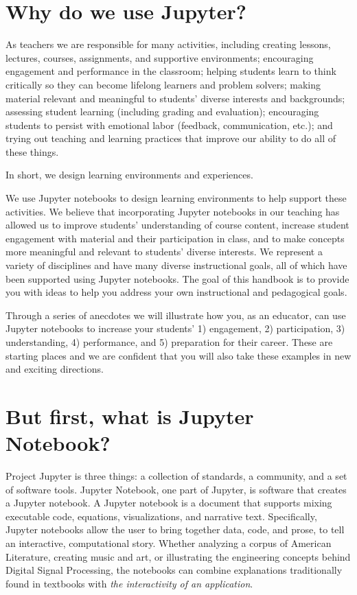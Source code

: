 \documentclass[]{book}
\begin{document}
\section{Why do we use Jupyter?}\label{why-do-we-use-jupyter}

As teachers we are responsible for many activities, including creating
lessons, lectures, courses, assignments, and supportive environments;
encouraging engagement and performance in the classroom; helping
students learn to think critically so they can become lifelong learners
and problem solvers; making material relevant and meaningful to
students' diverse interests and backgrounds; assessing student learning
(including grading and evaluation); encouraging students to persist with
emotional labor (feedback, communication, etc.); and trying out teaching
and learning practices that improve our ability to do all of these
things.

In short, we design learning environments and experiences.

We use Jupyter notebooks to design learning environments to help support
these activities. We believe that incorporating Jupyter notebooks in our
teaching has allowed us to improve students' understanding of course
content, increase student engagement with material and their
participation in class, and to make concepts more meaningful and
relevant to students' diverse interests. We represent a variety of
disciplines and have many diverse instructional goals, all of which have
been supported using Jupyter notebooks. The goal of this handbook is to
provide you with ideas to help you address your own instructional and
pedagogical goals.

Through a series of anecdotes we will illustrate how you, as an
educator, can use Jupyter notebooks to increase your students' 1)
engagement, 2) participation, 3) understanding, 4) performance, and 5)
preparation for their career. These are starting places and we are
confident that you will also take these examples in new and exciting
directions.

\section{But first, what is Jupyter
Notebook?}\label{but-first-what-is-jupyter-notebook}

Project Jupyter is three things: a collection of standards, a community,
and a set of software tools. Jupyter Notebook, one part of Jupyter, is
software that creates a Jupyter notebook. A Jupyter notebook is a
document that supports mixing executable code, equations,
visualizations, and narrative text. Specifically, Jupyter notebooks
allow the user to bring together data, code, and prose, to tell an
interactive, computational story. Whether analyzing a corpus of American
Literature, creating music and art, or illustrating the engineering
concepts behind Digital Signal Processing, the notebooks can combine
explanations traditionally found in textbooks with \emph{the
interactivity of an application}.
\end{document}
